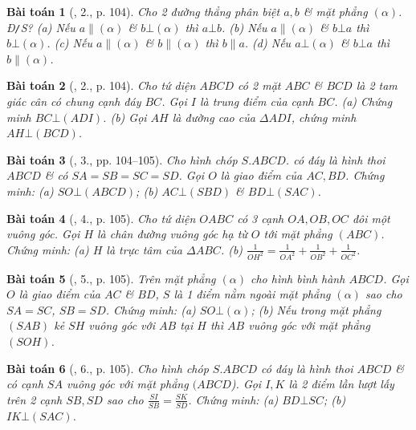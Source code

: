 \documentclass{article}
\numberwithin{equation}{section}
\newtheorem{baitoan}{Bài toán}
\begin{document}
\begin{baitoan}[\cite{SGK_Toan_11_hinh_hoc_co_ban}, 2., p. 104]
	Cho 2 đường thẳng phân biệt $a,b$ \& mặt phẳng $(\alpha)$. \emph{Đ\texttt{/}S?} (a)  Nếu $a\parallel(\alpha)$ \& $b\bot(\alpha)$ thì $a\bot b$. (b) Nếu $a\parallel(\alpha)$ \& $b\bot a$ thì $b\bot(\alpha)$. (c) Nếu $a\parallel(\alpha)$ \& $b\parallel(\alpha)$ thì $b\parallel a$. (d) Nếu $a\bot(\alpha)$ \& $b\bot a$ thì $b\parallel(\alpha)$.
\end{baitoan}

\begin{baitoan}[\cite{SGK_Toan_11_hinh_hoc_co_ban}, 2., p. 104]
	Cho tứ diện $ABCD$ có 2 mặt $ABC$ \& $BCD$ là 2 tam giác cân có chung cạnh đáy $BC$. Gọi $I$ là trung điểm của cạnh $BC$. (a) Chứng minh $BC\bot(ADI)$. (b) Gọi $AH$ là đường cao của $\Delta ADI$, chứng minh $AH\bot(BCD)$.
\end{baitoan}

\begin{baitoan}[\cite{SGK_Toan_11_hinh_hoc_co_ban}, 3., pp. 104--105]
	Cho hình chóp $S.ABCD$. có đáy là hình thoi $ABCD$ \& có $SA = SB = SC = SD$. Gọi $O$ là giao điểm của $AC,BD$. Chứng minh: (a) $SO\bot(ABCD)$; (b) $AC\bot(SBD)$ \& $BD\bot(SAC)$.
\end{baitoan}

\begin{baitoan}[\cite{SGK_Toan_11_hinh_hoc_co_ban}, 4., p. 105]
	Cho tứ diện $OABC$ có 3 cạnh $OA,OB,OC$ đôi một vuông góc. Gọi $H$ là chân đường vuông góc hạ từ $O$ tới mặt phẳng $(ABC)$. Chứng minh: (a) $H$ là trực tâm của $\Delta ABC$. (b) $\frac{1}{OH^2} = \frac{1}{OA^2} + \frac{1}{OB^2} + \frac{1}{OC^2}$. 
\end{baitoan}

\begin{baitoan}[\cite{SGK_Toan_11_hinh_hoc_co_ban}, 5., p. 105]
	Trên mặt phẳng $(\alpha)$ cho hình bình hành $ABCD$. Gọi $O$ là giao điểm của $AC$ \& $BD$, $S$ là 1 điểm nằm ngoài mặt phẳng $(\alpha)$ sao cho $SA = SC$, $SB = SD$. Chứng minh: (a) $SO\bot(\alpha)$; (b) Nếu trong mặt phẳng $(SAB)$ kẻ $SH$ vuông góc với $AB$ tại $H$ thì $AB$ vuông góc với mặt phẳng $(SOH)$.
\end{baitoan}

\begin{baitoan}[\cite{SGK_Toan_11_hinh_hoc_co_ban}, 6., p. 105]
	Cho hình chóp $S.ABCD$ có đáy là hình thoi $ABCD$ \& có cạnh $SA$ vuông góc với mặt phẳng $(ABCD$). Gọi $I,K$ là 2 điểm lần lượt lấy trên 2 cạnh $SB,SD$ sao cho $\frac{SI}{SB} = \frac{SK}{SD}$. Chứng minh: (a) $BD\bot SC$; (b) $IK\bot(SAC)$.
\end{baitoan}
\end{document}
